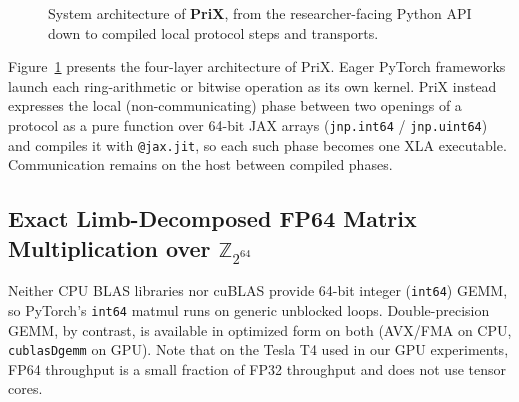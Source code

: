 \documentclass[11pt]{article}
\newcommand{\Zring}{\mathbb{Z}_{2^{64}}}
\begin{document}
\begin{figure}[t]
{%
}
\caption{System architecture of \textbf{PriX}, from the researcher-facing Python API down to compiled local protocol steps and transports.}
\label{fig:architecture}
\end{figure}

Figure~\ref{fig:architecture} presents the four-layer architecture of PriX. Eager PyTorch frameworks launch each ring-arithmetic or bitwise operation as its own kernel. PriX instead expresses the local (non-communicating) phase between two openings of a protocol as a pure function over 64-bit JAX arrays (\texttt{jnp.int64} / \texttt{jnp.uint64}) and compiles it with \texttt{@jax.jit}, so each such phase becomes one XLA executable. Communication remains on the host between compiled phases.

\subsection{Exact Limb-Decomposed FP64 Matrix Multiplication over $\Zring$}
\label{sec:limb_matmul}
Neither CPU BLAS libraries nor cuBLAS provide 64-bit integer (\texttt{int64}) GEMM, so PyTorch's \texttt{int64} matmul runs on generic unblocked loops. Double-precision GEMM, by contrast, is available in optimized form on both (AVX/FMA on CPU, \texttt{cublasDgemm} on GPU). Note that on the Tesla T4 used in our GPU experiments, FP64 throughput is a small fraction of FP32 throughput and does not use tensor cores.
\end{document}
